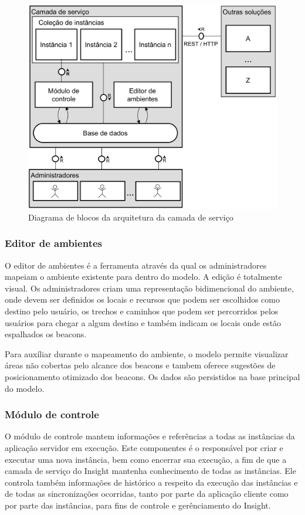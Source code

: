 \documentclass[english,brazilian]{UNISINOSmonografia}
\begin{document}
\begin{figure}[!ht]
	\caption{Diagrama de blocos da arquitetura da camada de serviço}
	\label{fig:arquiteturaServico}
	\centering%
	\begin{minipage}{.7\textwidth}
		\includegraphics[width=\textwidth]{imgs/arquiteturaServico.png}
	\end{minipage}
\end{figure}

	\subsubsection{Editor de ambientes}
O editor de ambientes é a ferramenta através da qual os administradores mapeiam o ambiente existente para dentro do modelo. A edição é totalmente visual. Os administradores criam uma representação bidimencional do ambiente, onde devem ser definidos os locais e recursos que podem ser escolhidos como destino pelo usuário, os trechos e caminhos que podem ser percorridos pelos usuários para chegar a algum destino e também indicam os locais onde estão espalhados os beacons.

Para auxíliar durante o mapeamento do ambiente, o modelo permite visualizar áreas não cobertas pelo alcance dos beacons e tambem oferece sugestões de posicionamento otimizado dos beacons. Os dados são persistidos na base principal do modelo.

	\subsubsection{Módulo de controle}
O módulo de controle mantem informações e referências a todas as instâncias da aplicação servidor em execução. Este componentes é o responsável por criar e executar uma nova instância, bem como encerrar sua execução, a fim de que a camada de serviço do Insight mantenha conhecimento de todas as instâncias. Ele controla também informações de histórico a respeito da execução das instâncias e de todas as sincronizações ocorridas, tanto por parte da aplicação cliente como por parte das instâncias, para fins de controle e gerênciamento do Insight. 
\end{document}
